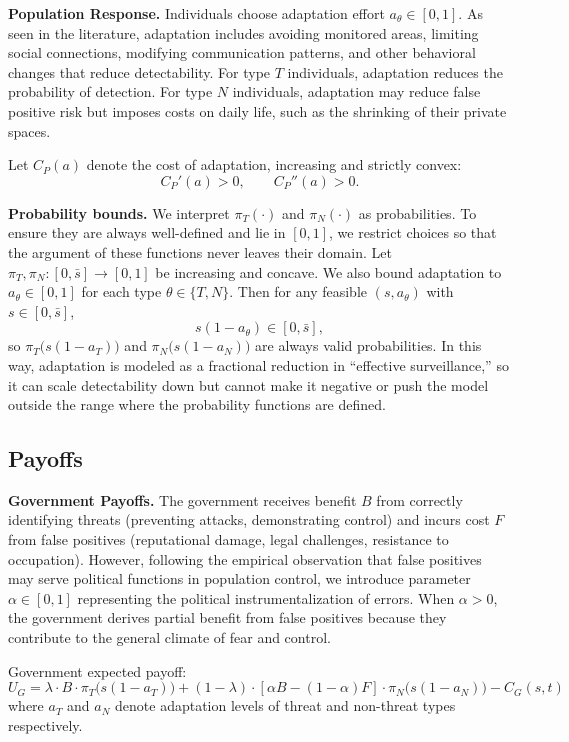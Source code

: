 \documentclass[11pt,a4paper]{article}
\theoremstyle{definition}
\theoremstyle{remark}
\theoremstyle{definition}
\begin{document}
\textbf{Population Response.} Individuals choose adaptation effort $a_\theta \in [0,1]$. As seen in the literature, adaptation includes avoiding monitored areas, 
limiting social connections, modifying communication patterns, and other behavioral changes that reduce detectability. For type $T$ individuals, 
adaptation reduces the probability of detection. For type $N$ individuals, adaptation may reduce false positive risk but imposes costs on daily 
life, such as the shrinking of their private spaces.

Let $C_P(a)$ denote the cost of adaptation, increasing and strictly convex:
$$
C_P'(a) > 0,
\qquad
C_P''(a) > 0.
$$

\textbf{Probability bounds.} We interpret $\pi_T(\cdot)$ and $\pi_N(\cdot)$ as probabilities. To ensure they are always well-defined and lie 
in $[0,1]$, we restrict choices so that the argument of these functions never leaves their domain. Let $\pi_T,\pi_N:[0,\bar s]\to[0,1]$ be 
increasing and concave. We also bound adaptation to $a_\theta\in[0,1]$ for each type $\theta\in\{T,N\}$. Then for any feasible 
$(s,a_\theta)$ with $s\in[0,\bar s]$,
$$
s(1-a_\theta)\in[0,\bar s],
$$
so $\pi_T\!\big(s(1-a_T)\big)$ and $\pi_N\!\big(s(1-a_N)\big)$ are always valid probabilities. In this way, adaptation is modeled as a fractional 
reduction in ``effective surveillance,'' so it can scale detectability down but cannot make it negative or push the model outside the range 
where the probability functions are defined.

\subsection{Payoffs}

\textbf{Government Payoffs.} The government receives benefit $B$ from correctly identifying threats (preventing attacks, demonstrating control) 
and incurs cost $F$ from false positives (reputational damage, legal challenges, resistance to occupation). However, following the empirical 
observation that false positives may serve political functions in population control, we introduce parameter $\alpha \in [0,1]$ representing 
the political instrumentalization of errors. When $\alpha > 0$, the government derives partial benefit from false positives because they 
contribute to the general climate of fear and control.

Government expected payoff:
\begin{equation}
U_G = \lambda \cdot B \cdot \pi_T\!\big(s(1 - a_T)\big) + (1-\lambda) \cdot [\alpha B - (1-\alpha)F] \cdot \pi_N\!\big(s(1 - a_N)\big) - C_G(s,t)
\end{equation}
where $a_T$ and $a_N$ denote adaptation levels of threat and non-threat types respectively.  
\end{document}
